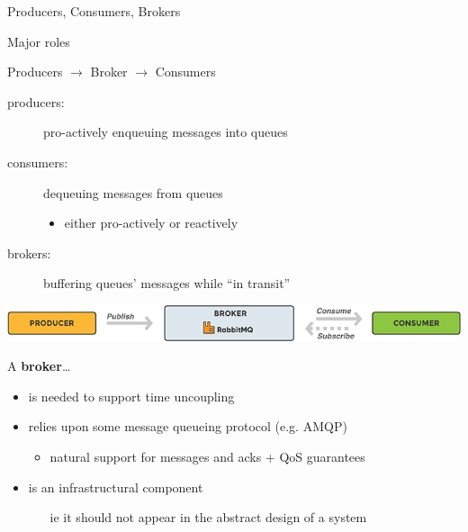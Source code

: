 \documentclass{beamer}\mode<presentation>{\usetheme{AMSBolognaFC}}
\begin{document}
\begin{frame}[allowframebreaks]{Producers, Consumers, Brokers}

    \begin{block}{Major roles}
        \begin{center}
            Producers $\rightarrow$ Broker $\rightarrow$ Consumers
        \end{center}
        \begin{description}
            \item[producers:] pro-actively enqueuing messages into queues
            \item[consumers:] dequeuing messages from queues
            \begin{itemize}
                \item either pro-actively or reactively
            \end{itemize}
            \item[brokers:] buffering queues' messages while ``in transit''
        \end{description}
    \end{block}
    \begin{center}
        \includegraphics[width=\linewidth]{img/broker.png}
    \end{center}

    \framebreak

    \begin{block}{A \textbf{broker}\ldots}
        \begin{itemize}
            \item is needed to support \alert{time uncoupling}
            \item relies upon some \alert{message queueing} protocol (e.g. AMQP)
            \begin{itemize}
                \item natural support for messages and acks + QoS guarantees
            \end{itemize}
            \item is an \alert{infrastructural} component
            \begin{itemize}
                \item[ie] it should not appear in the abstract design of a system
            \end{itemize}
        \end{itemize}
    \end{block}


\end{frame}
\end{document}
